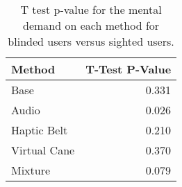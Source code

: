 
\begin{table}[!htb]
\centering
\caption{T test p-value for the mental demand on each method for blinded users versus sighted users.}
\label{tab:ttest_mental_demand}
\begin{tabular}{lr}
\toprule
      Method &  T-Test P-Value \\
\midrule
        Base &           0.331 \\
       Audio &           0.026 \\
 Haptic Belt &           0.210 \\
Virtual Cane &           0.370 \\
     Mixture &           0.079 \\
\bottomrule
\end{tabular}
\end{table}

